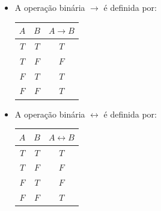 \begin{metadefinition}
\begin{itemize}
\begin{center}
            \begin{tabular}{c|c|c}
                $A$ & $B$ & $A\vee B$ \\
                \hline
                $T$ & $T$ & $T$ \\
                $T$ & $F$ & $T$ \\
                $F$ & $T$ & $T$ \\
                $F$ & $F$ & $F$
            \end{tabular}
        \end{center}
        \item A operação binária $\rightarrow$ é definida por:
        \begin{center}
            \begin{tabular}{c|c|c}
                $A$ & $B$ & $A\rightarrow B$ \\
                \hline
                $T$ & $T$ & $T$ \\
                $T$ & $F$ & $F$ \\
                $F$ & $T$ & $T$ \\
                $F$ & $F$ & $T$
            \end{tabular}
        \end{center}
        \item A operação binária $\leftrightarrow$ é definida por:
        \begin{center}
            \begin{tabular}{c|c|c}
                $A$ & $B$ & $A\leftrightarrow B$ \\
                \hline
                $T$ & $T$ & $T$ \\
                $T$ & $F$ & $F$ \\
                $F$ & $T$ & $F$ \\
                $F$ & $F$ & $T$
            \end{tabular}
        \end{center}
    \end{itemize}
\end{metadefinition}

